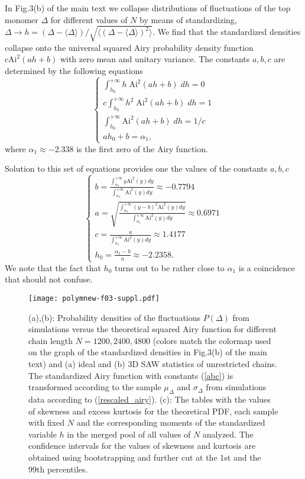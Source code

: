 \documentclass[aps,pre,floatfix,twocolumn,nofootinbib]{revtex4-2}
\newcommand{\eq}[1]{(\ref{#1})}
\begin{document}
In Fig.3(b) of the main text we collapse distributions of fluctuations of the top monomer $\Delta$ for different values of $N$ by means of standardizing, $\Delta \to h=(\Delta-\langle \Delta \rangle)/\sqrt{\langle (\Delta-\langle \Delta \rangle)^2\rangle}$. We find that the standardized densities collapse onto the universal squared Airy probability density function $c \mathrm{Ai}^2(ah+b)$ with zero mean and unitary variance. The constants $a,b,c$ are determined by the following equations
\begin{equation}
\begin{cases}
\int_{h_0}^{+\infty} h \; \mathrm{Ai}^2(ah+b)\; dh = 0 \\
c \int_{h_0}^{+\infty} h^2 \; \mathrm{Ai}^2(ah+b)\; dh = 1 \\
\int_{h_0}^{+\infty} \mathrm{Ai}^2(ah+b)\; dh = 1/c \\
ah_0+b = \alpha_1,
\end{cases}
\end{equation}
where $\alpha_1 \approx -2.338$ is the first zero of the Airy function.

Solution to this set of equations provides one the values of the constants $a,b,c$
\begin{equation}
\begin{cases}
b = \frac{\int_{\alpha_1}^{+\infty} y \mathrm{Ai}^2(y) dy}{\int_{\alpha_1}^{+\infty} \mathrm{Ai}^2(y) dy} \approx -0.7794 \\
a = \sqrt{\frac{\int_{\alpha_1}^{+\infty} (y-b)^2 \mathrm{Ai}^2(y) dy}{\int_{\alpha_1}^{+\infty} \mathrm{Ai}^2(y) dy}} \approx 0.6971 \\
c = \frac{a}{\int_{\alpha_1}^{+\infty} \mathrm{Ai}^2(y) dy} \approx 1.4177 \\
h_0 = \frac{\alpha_1-b}{a} \approx -2.2358.
\end{cases}
\label{abc}
\end{equation}
We note that the fact that $h_0$ turns out to be rather close to $\alpha_1$ is a coincidence that should not confuse.

\begin{figure*}
\texttt{[image: polymnew-f03-suppl.pdf]}
  \caption{(a),(b): Probability densities of the fluctuations $P(\Delta)$ from simulations versus the theoretical squared Airy function for different chain length $N=1200,2400,4800$ (colors match the colormap used on the graph of the standardized densities in Fig.3(b) of the main text) and (a) ideal and (b) 3D SAW statistics of unrestricted chains. The standardized Airy function with constants \eq{abc} is transformed according to the sample $\mu_\Delta$ and $\sigma_\Delta$ from simulations data according to \eq{rescaled_airy}. (c): The tables with the values of skewness and excess kurtosis for the theoretical PDF, each sample with fixed $N$ and the corresponding moments of the standardized variable $h$ in the merged pool of all values of $N$ analyzed. The confidence intervals for the values of skewness and kurtosis are obtained using bootstrapping and further cut at the 1st and the 99th percentiles.
}
  \label{fig:distrs}
\end{figure*}
\end{document}
